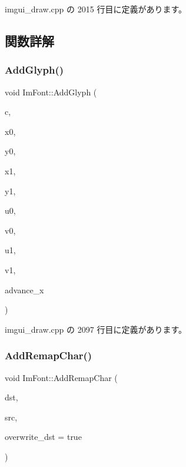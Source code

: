  imgui\+\_\+draw.\+cpp の 2015 行目に定義があります。



\subsection{関数詳解}
\mbox{\label{struct_im_font_ae63d3d343052336d7718aacac8f394b7}} 
\subsubsection{\texorpdfstring{Add\+Glyph()}{AddGlyph()}}
{\footnotesize\ttfamily void Im\+Font\+::\+Add\+Glyph (\begin{DoxyParamCaption}\item[{\mbox{\hyperlink{imgui_8h_af2c7badaf05a0008e15ef76d40875e97}{Im\+Wchar}}}]{c,  }\item[{float}]{x0,  }\item[{float}]{y0,  }\item[{float}]{x1,  }\item[{float}]{y1,  }\item[{float}]{u0,  }\item[{float}]{v0,  }\item[{float}]{u1,  }\item[{float}]{v1,  }\item[{float}]{advance\+\_\+x }\end{DoxyParamCaption})}



 imgui\+\_\+draw.\+cpp の 2097 行目に定義があります。

\mbox{\label{struct_im_font_aba8cd20f14ba47175d45d3f2063aa329}} 
\subsubsection{\texorpdfstring{Add\+Remap\+Char()}{AddRemapChar()}}
{\footnotesize\ttfamily void Im\+Font\+::\+Add\+Remap\+Char (\begin{DoxyParamCaption}\item[{\mbox{\hyperlink{imgui_8h_af2c7badaf05a0008e15ef76d40875e97}{Im\+Wchar}}}]{dst,  }\item[{\mbox{\hyperlink{imgui_8h_af2c7badaf05a0008e15ef76d40875e97}{Im\+Wchar}}}]{src,  }\item[{bool}]{overwrite\+\_\+dst = {\ttfamily true} }\end{DoxyParamCaption})}



